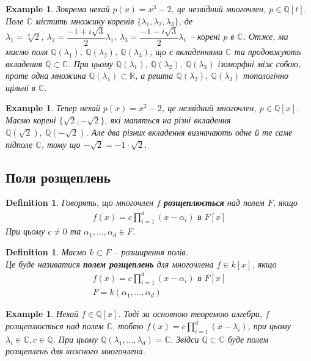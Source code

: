 \documentclass[a4paper, 10pt]{article}
\theoremstyle{theoremdd}
\theoremstyle{theoremdd}
\newtheorem{definition}[theorem]{Definition}
\theoremstyle{theoremdd}
\theoremstyle{theoremdd}
\theoremstyle{theoremdd}
\newtheorem{example}[theorem]{Example}
\theoremstyle{theoremdd}
\theoremstyle{theoremdd}
\theoremstyle{theoremdd}
\theoremstyle{theoremdd}
\theoremstyle{theoremdd}
\theoremstyle{theoremdd}
\theoremstyle{theoremdd}
\theoremstyle{theoremdd}
\theoremstyle{theoremdd}
\theoremstyle{theoremdd}
\begin{document}
\begin{example}
Зокрема нехай $p(x) = x^3 - 2$, це незвідний многочлен, $p \in \mathbb{Q}[t]$. Поле $\mathbb{C}$ містить множину коренів $\{\lambda_1,\lambda_2,\lambda_3\}$, де $\lambda_1 = \sqrt[3]{2},\ \lambda_2 = \dfrac{-1+i \sqrt{3}}{2} \lambda_1,\ \lambda_3 = \dfrac{-1-i\sqrt{3}}{2} \lambda_1$ -- корені $p$ в $\mathbb{C}$. Отже, ми маємо поля $\mathbb{Q}(\lambda_1),\ \mathbb{Q}(\lambda_2),\ \mathbb{Q}(\lambda_3)$, що є вкладеннями $\mathbb{C}$ та продовжують вкладення $\mathbb{Q} \subset \mathbb{C}$. При цьому $\mathbb{Q}(\lambda_1),\ \mathbb{Q}(\lambda_2),\ \mathbb{Q}(\lambda_3)$ ізоморфні між собою, проте одна множина $\mathbb{Q}(\lambda_1) \subset \mathbb{R}$, а решта $\mathbb{Q}(\lambda_2),\ \mathbb{Q}(\lambda_3)$ топологічно щільні в $\mathbb{C}$.
\end{example}

\begin{example}
Тепер нехай $p(x) = x^2 - 2$, це незвідний многочлен, $p \in \mathbb{Q}[x]$. Маємо корені $\{ \sqrt{2}, -\sqrt{2}\}$, які мапяться на різні вкладення $\mathbb{Q}(\sqrt{2}),\ \mathbb{Q}(-\sqrt{2})$. Але два різних вкладення визначають одне й те саме підполе $\mathbb{C}$, тому що $-\sqrt{2} = -1 \cdot \sqrt{2}$.
\end{example}

\subsection{Поля розщеплень}
\begin{definition}
Говорять, що многочлен $f$ \textbf{розщеплюється} над полем $F$, якщо
\begin{align*}
f(x) = c \prod_{i=1}^d (x-\alpha_i) \text{ в } F[x]
\end{align*}
При цьому $c \neq 0$ та $\alpha_1,\dots,\alpha_d \in F$.
\end{definition}

\begin{definition}
Маємо $k \subset F$ -- розширення полів.\\
Це буде називатися \textbf{полем розщеплень} для многочлена $f \in k[x]$, якщо
\begin{align*}
f(x) = c \prod_{i=1}^d (x-\alpha_i) \text{ в } F[x] \\
F = k(\alpha_1,\dots,\alpha_d)
\end{align*}
\end{definition}

\begin{example}
Нехай $f \in \mathbb{Q}[x]$. Тоді за основною теоремою алгебри, $f$ розщеплюється над полем $\mathbb{C}$, тобто $f(x) = c \displaystyle\prod_{i=1}^d (x-\lambda_i)$, при цьому $\lambda_i \in \mathbb{C}, c \in \mathbb{Q}$. При цьому $\mathbb{Q}(\lambda_1,\dots,\lambda_d) = \mathbb{C}$. Звідси $\mathbb{Q} \subset \mathbb{C}$ буде полем розщеплень для кожного многочлена.
\end{example}
\end{document}

